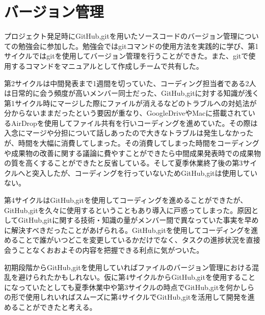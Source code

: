 \section{バージョン管理}
プロジェクト発足時にGitHub,gitを用いたソースコードのバージョン管理についての勉強会に参加した。勉強会ではgitコマンドの使用方法を実践的に学び、第1サイクルではgitを使用してバージョン管理を行うことができた。また、gitで使用するコマンドをマニュアルとして作成しチームで共有した。
\par 第2サイクルは中間発表まで1週間を切っていた、コーディング担当者である2人は日常的に会う頻度が高いメンバー同士だった、GitHub,gitに対する知識が浅く第1サイクル時にマージした際にファイルが消えるなどのトラブルへの対処法が分からないままだったという要因が重なり、GoogleDriveやMacに搭載されているAirDropを使用してファイル共有を行いコーディングを進めていた。その際は入念にマージや分担について話しあったので大きなトラブルは発生しなかったが、時間を大幅に消費してしまった。その消費してしまった時間をコーディングや成果物の改善に関する議論に費やすことができたら中間成果発表時での成果物の質を高くすることができたと反省している。そして夏季休業終了後の第3サイクルへと突入したが、コーディングを行っていないためGitHub,gitは使用していない。
\par 第4サイクルはGitHub,gitを使用してコーディングを進めることができたが、GitHub,gitを久々に使用するということもあり導入に戸惑ってしまった。原因としてGitHub,gitに関する技術・知識の量がメンバー間で異なっていた事実を早めに解決すべきだったことがあげられる。GitHub,gitを使用してコーディングを進めることで誰がいつどこを変更しているかだけでなく、タスクの進捗状況を直接会うことなくおおよその内容を把握できる利点に気がついた。
\par  初期段階からGitHub,gitを使用していればファイルのバージョン管理における混乱を避けられたかもしれない。仮に第4サイクルからGitHub,gitを使用することになっていたとしても夏季休業中や第3サイクルの時点でGitHub,gitを何かしらの形で使用しれいればスムーズに第4サイクルでGitHub,gitを活用して開発を進めることができたと考える。

